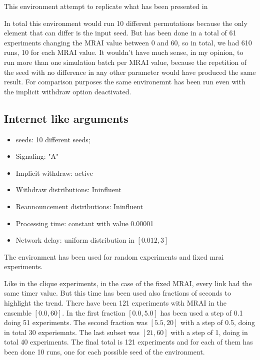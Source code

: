 \documentclass[10pt,conference,letterpaper]{IEEEtran}
\begin{document}
This environment attempt to replicate what has been presented in \cite{griffin2001experimental}

In total this environment would run 10 different permutations because the only
element that can differ is the input seed.
But has been done in a total of \num{61} experiments changing the \ac{MRAI} value between
$0$ and $60$, so in total, we had \num{610} runs, \num{10} for each \ac{MRAI} value.
It wouldn't have much sense, in my opinion, to run more than one simulation batch per
\ac{MRAI} value, because the repetition of the seed with no difference in any
other parameter would have produced the same result.
For comparison purposes the same environemnt has been run even with the 
implicit withdraw option deactivated.

\subsection{Internet like arguments}
\label{subsec:internet_like_arguments}

\begin{itemize}
	\item seeds: \num{10} different seeds;
	\item Signaling: "A" 
	\item Implicit withdraw: active
	\item Withdraw distributions: Ininfluent
	\item Reannouncement distributions: Ininfluent 
	\item Processing time: constant with value \num{0.00001}
	\item Network delay: uniform distribution in $[0.012, 3]$
\end{itemize} 

The environment has been used for random experiments and fixed mrai experiments.

Like in the clique experiments, in the case of the fixed \ac{MRAI}, every link
had the same timer value.
But this time has been used also fractions of seconds to highlight the trend.
There have been \num{121} experiments with \ac{MRAI} in the ensemble $[0.0, 60]$.
In the first fraction $[0.0, 5.0]$ has been used a step of \num{0.1} doing \num{51}
experiments.
The second fraction was $[5.5, 20]$ with a step of \num{0.5}, doing in total \num{30}
experiemnts.
The last subset was $[21, 60]$ with a step of \num{1}, doing in total \num{40}
experiments.
The final total is \num{121} experiments and for each of them has been done
\num{10} runs, one for each possible seed of the environment.
\end{document}
